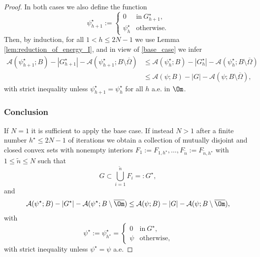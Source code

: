 \begin{proof}
In both cases we also define the function
\begin{equation*}
\psi_{h+1}^\star:=\begin{cases}
0&\text{in}\ G_{h+1}^\star,\\
\psi_h^\star&\text{otherwise}.
\end{cases}
\end{equation*}
Then, by induction, for all $1<h\le 2N-1$ we use Lemma \ref{lem:reduction_of_energy_I}, and
in view of \eqref{base_case} we infer
\begin{align*}
\mathcal A(\psi_{h+1}^\star;B)-|G_{h+1}^\star|-\mathcal A(\psi_{h+1}^\star;B\setminus \overline\Omega)&\leq 
\mathcal A(\psi_h^\star;B)-|G_h^\star|-\mathcal A(\psi_h^\star;B\setminus \overline\Omega)\\
&\leq 
\mathcal A(\psi;B)-|G|-\mathcal A(\psi;B\setminus \overline\Omega),
\end{align*}
with strict inequality unless $\psi_{h+1}^\star=\psi_h^\star$ for all $h$ a.e. in $\Om$.

\subsubsection*{Conclusion} If $N=1$ it is sufficient to apply
the base case. If instead $N>1$ after a finite number $h^\star\le 2N-1$ of iterations we obtain a collection of mutually disjoint and closed convex sets with nonempty interiors $F_1:=F_{1,h^\star},\dots,F_{\tilde n}:=F_{\tilde n,h^\star}$ with $1\le \tilde n\le N$ such that
\[
G\subset \bigcup_{i=1}^{\tilde n}F_i=:G^\star,
\]
and
\begin{equation*}\mathcal{A}(\psi^\star;B)-|G^\star|-\mathcal{A}(\psi^\star;B\setminus \overline\Om)\le \mathcal A(\psi; B)-|G|-\mathcal{A}(\psi;B\setminus\overline{\Om}),
\end{equation*}
with
\begin{equation*}
\psi^\star:=\psi_{h^\star}^\star=\begin{cases}
0&\text{in}\ G^\star,\\
\psi&\text{otherwise},
\end{cases}
\end{equation*}
with strict inequality unless $\psi^\star=\psi$ a.e.
\end{proof}

